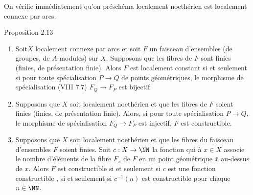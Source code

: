 \documentclass[10pt]{../fichiers-configuration-latex/smfart}
\begin{document}
On vérifie immédiatement qu'on préschéma localement noethérien est
localement connexe par arcs.

\begin{enonce*}{Proposition 2.13}
\begin{enumerate}
\renewcommand{\theenumi}{\roman{enumi}}
\renewcommand{\labelenumi}{(\theenumi)}
\item Soit\pageoriginale $X$ localement connexe par arcs et soit $F$
un faisceau d'ensembles (\resp de groupes, \resp de $A$-modules) sur
$X$. Supposons que les fibres de $F$ sont finies (\resp finies, \resp
de présentation finie). Alors $F$ est localement constant si et
seulement si pour toute spécialisation $P\rightarrow Q$ de points
géométriques, le morphisme de spécialisation {\rm (VIII 7.7)}
$F_Q\rightarrow F_P$ est bijectif.

\item Supposons que $X$ soit localement noethérien et que les fibres
de $F$ soient finies (\resp finies, \resp de présentation
finie). Alors, si pour toute spécialisation $P\rightarrow Q$, le
morphisme de spécialisation $F_Q\rightarrow F_P$ est injectif, $F$ est
constructible.

\item Supposons que $X$ soit localement noethérien et que les fibres
du faisceau d'ensembles $F$ soient finies. Soit $c:X\rightarrow
\NN$ la fonction qui à $x\in X$ associe le nombre
d'éléments de la fibre $F_{\bar{x}}$ de $F$ en un point géométrique
$\bar{x}$ au-dessus de $x$. Alors $F$ est constructible si et seulement
si $c$ est une fonction constructible \ie, si et seulement si
$c^{-1}(n)$ est constructible pour chaque $n\in \NN$.
\end{enumerate}
\end{enonce*}
\end{document}

